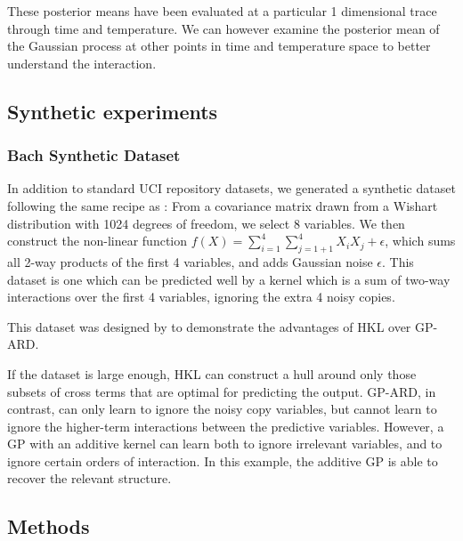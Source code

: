 \documentclass[twoside]{article}
\begin{document}
These posterior means have been evaluated at a particular 1 dimensional trace through time and temperature.
We can however examine the posterior mean of the Gaussian process at other points in time and temperature space to better understand the interaction.

\subsection{Synthetic experiments}

\subsubsection{Bach Synthetic Dataset}
In addition to standard UCI repository datasets, we generated a synthetic dataset following the same recipe as \cite{DBLP:journals/corr/abs-0909-0844}: From a covariance matrix drawn from a Wishart distribution with 1024 degrees of freedom, we select 8 variables.  We then construct the non-linear function $f(X) = \sum_{i=1}^4 \sum_{j=1+1}^4 X_i X_j + \epsilon$, which sums all 2-way products of the first 4 variables, and adds Gaussian noise $\epsilon$.  This dataset is one which can be predicted well by a kernel which is a sum of two-way interactions over the first 4 variables, ignoring the extra 4 noisy copies.

This dataset was designed by \cite{DBLP:journals/corr/abs-0909-0844} to demonstrate the advantages of HKL over GP-ARD. 

If the dataset is large enough, HKL can construct a hull around only those subsets of cross terms that are optimal for predicting the output.  GP-ARD, in contrast, can only learn to ignore the noisy copy variables, but cannot learn to ignore the higher-term interactions between the predictive variables.  However, a GP with an additive kernel can learn both to ignore irrelevant variables, and to ignore certain orders of interaction.  In this example, the additive GP is able to recover the relevant structure.

\subsection{Methods}
\end{document}
